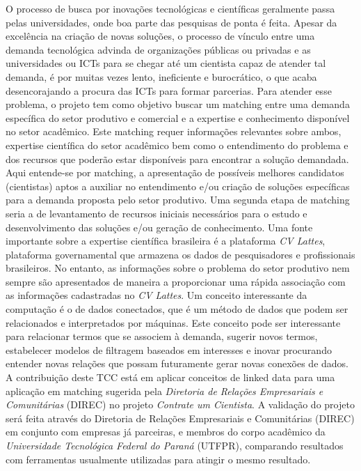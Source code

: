 \begin{resumoutfpr}
    O processo de busca por inovações tecnológicas e científicas geralmente passa pelas universidades, onde boa parte das pesquisas de ponta é feita. Apesar da excelência na criação de novas soluções, o processo de vínculo entre uma demanda tecnológica advinda de organizações públicas ou privadas e as universidades ou ICTs para se chegar até um cientista capaz de atender tal demanda, é por muitas vezes lento, ineficiente e burocrático, o que acaba desencorajando a procura das ICTs para formar parcerias. Para atender esse problema, o projeto tem como objetivo buscar um matching entre uma demanda específica do setor produtivo e comercial e a expertise e conhecimento disponível no setor acadêmico. Este matching requer informações relevantes sobre ambos, expertise científica do setor acadêmico bem como o entendimento do problema e dos recursos que poderão estar disponíveis para encontrar a solução demandada. Aqui entende-se por matching, a apresentação de possíveis melhores candidatos (cientistas) aptos a auxiliar no entendimento e/ou criação de soluções específicas para a demanda proposta pelo setor produtivo. Uma segunda etapa de matching seria a de levantamento de recursos iniciais necessários para o estudo e desenvolvimento das soluções e/ou geração de conhecimento. Uma fonte importante sobre a expertise científica brasileira é a plataforma \emph{CV Lattes}, plataforma governamental que armazena os dados de pesquisadores e profissionais brasileiros. No entanto, as informações sobre o problema do setor produtivo nem sempre são apresentados de maneira a proporcionar uma rápida associação com as informações cadastradas no \emph{CV Lattes}.
    Um conceito interessante da computação é o de dados conectados, que é um método de dados que podem ser relacionados e interpretados por máquinas. Este conceito pode ser interessante para relacionar termos que se associem à demanda, sugerir novos termos, estabelecer modelos de filtragem baseados em interesses e inovar procurando entender novas relações que possam futuramente gerar novas conexões de dados. A contribuição deste TCC está em aplicar conceitos de linked data para uma aplicação em matching sugerida pela \emph{Diretoria de Relações Empresariais e Comunitárias} (DIREC) no projeto \emph{Contrate um Cientista}. A validação do projeto será feita através do Diretoria de Relações Empresariais e Comunitárias (DIREC) em conjunto com empresas já parceiras, e membros do corpo acadêmico da \emph{Universidade Tecnológica Federal do Paraná} (UTFPR), comparando resultados com ferramentas usualmente utilizadas para atingir o mesmo resultado.
\end{resumoutfpr}